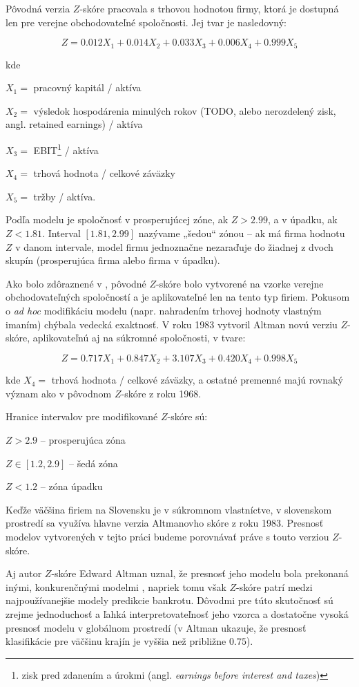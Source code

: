 Pôvodná verzia \(Z\)-skóre pracovala s trhovou hodnotou firmy, ktorá je dostupná len pre verejne obchodovateľné spoločnosti. Jej tvar je nasledovný:

\[
    Z = 0.012X_1 + 0.014X_2 + 0.033X_3 + 0.006X_4 + 0.999X_5
\]

kde

\(X_1 = \) pracovný kapitál / aktíva

\(X_2 = \) výsledok hospodárenia minulých rokov (TODO, alebo nerozdelený zisk, angl. retained earnings) / aktíva

\(X_3 = \) EBIT\footnote{zisk pred zdanením a úrokmi (angl. \emph{earnings before interest and taxes})} / aktíva

\(X_4 = \) trhová hodnota / celkové záväzky

\(X_5 = \) tržby / aktíva.

Podľa modelu je spoločnosť v prosperujúcej zóne, ak \(Z > 2.99\), a v úpadku, ak \(Z < 1.81\).
Interval \([1.81, 2.99]\) nazývame „šedou“ zónou – ak má firma hodnotu \(Z\) v danom intervale, model firmu jednoznačne nezaraďuje do žiadnej z dvoch skupín
(prosperujúca firma alebo firma v úpadku).

Ako bolo zdôraznené v \cite{altman1983}, pôvodné \(Z\)-skóre bolo vytvorené na vzorke verejne obchodovateľných spoločností a je aplikovateľné len na tento typ firiem.
Pokusom o \emph{ad hoc} modifikáciu modelu (napr. nahradením trhovej hodnoty vlastným imaním) chýbala vedecká exaktnosť.
V roku 1983 vytvoril Altman novú verziu \(Z\)-skóre, aplikovateľnú aj na súkromné spoločnosti, v tvare:

\[
    Z = 0.717X_1 + 0.847X_2 + 3.107X_3 + 0.420X_4 + 0.998X_5
\]

kde \(X_4 = \) trhová hodnota / celkové záväzky, a ostatné premenné majú rovnaký význam ako v pôvodnom \(Z\)-skóre z roku 1968.

Hranice intervalov pre modifikované \(Z\)-skóre sú:

\( Z > 2.9\) – prosperujúca zóna

\( Z \in [1.2, 2.9]\) – šedá zóna

\( Z < 1.2 \) – zóna úpadku

Keďže väčšina firiem na Slovensku je v súkromnom vlastníctve, v slovenskom prostredí sa využíva hlavne verzia Altmanovho skóre z roku 1983.
Presnosť modelov vytvorených v tejto práci budeme porovnávať práve s touto verziou \(Z\)-skóre.

Aj autor \(Z\)-skóre Edward Altman uznal, že presnosť jeho modelu bola prekonaná inými, konkurenčnými modelmi \cite{altman2017}, napriek tomu však \(Z\)-skóre patrí medzi najpoužívanejšie modely predikcie bankrotu.
Dôvodmi pre túto skutočnosť sú zrejme jednoduchosť a ľahká interpretovateľnosť jeho vzorca a dostatočne vysoká presnosť modelu v globálnom prostredí
(v \cite{altman2017} Altman ukazuje, že presnosť klasifikácie pre väčšinu krajín je vyššia než približne \(0.75\)).


